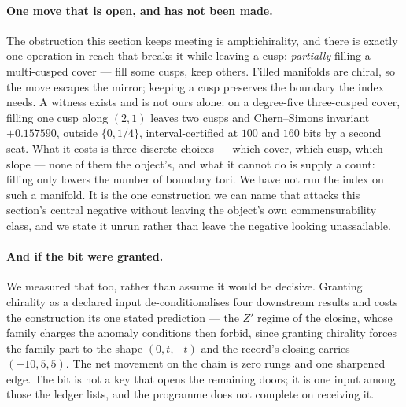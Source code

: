 \documentclass[11pt,a4paper]{article}
\theoremstyle{definition}
\theoremstyle{remark}
\begin{document}
\paragraph{One move that is open, and has not been made.} The obstruction this section keeps meeting is
amphichirality, and there is exactly one operation in reach that breaks it while leaving a cusp: \emph{partially}
filling a multi-cusped cover --- fill some cusps, keep others. Filled manifolds are chiral, so the move escapes the
mirror; keeping a cusp preserves the boundary the index needs. A witness exists and is not ours alone: on a degree-five
three-cusped cover, filling one cusp along $(2,1)$ leaves two cusps and Chern--Simons invariant $+0.157590$, outside
$\{0,1/4\}$, interval-certified at $100$ and $160$ bits by a second seat. What it costs is three discrete choices --- which
cover, which cusp, which slope --- none of them the object's, and what it cannot do is supply a count: filling only
lowers the number of boundary tori. We have not run the index on such a manifold. It is the one construction we can name
that attacks this section's central negative without leaving the object's own commensurability class, and we state it
unrun rather than leave the negative looking unassailable.

\paragraph{And if the bit were granted.} We measured that too, rather than assume it would be decisive.
Granting chirality as a declared input de-conditionalises four downstream results and costs the construction its one
stated prediction --- the $Z'$ regime of the closing, whose family charges the anomaly conditions then forbid, since
granting chirality forces the family part to the shape $(0,t,-t)$ and the record's closing carries $(-10,5,5)$. The net
movement on the chain is zero rungs and one sharpened edge. The bit is not a key that opens the remaining doors; it is
one input among those the ledger lists, and the programme does not complete on receiving it.
\end{document}
